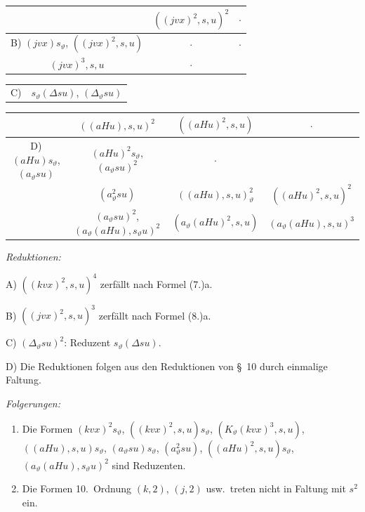 \documentclass[12pt,a4paper]{article}
\begin{document}
\begin{center}
\begin{tabular}{c|c|c}
& $((jvx)^2, s, u)^2$ & $\cdot$ \\
\hline
B) $(jvx)s_\vartheta$, $((jvx)^2, s, u)$ & $\cdot$ & $\cdot$ \\
$(jvx)^3, s, u$ & $\cdot$ &
\end{tabular}
\end{center}

\begin{center}
\begin{tabular}{c|c}
C) & $s_\vartheta(\varDelta su)$, $(\varDelta_\vartheta su)$
\end{tabular}
\end{center}

\begin{center}
\begin{tabular}{c|c|c|c}
& $((aHu), s, u)^2$ & $((aHu)^2, s, u)$ & $\cdot$ \\
\hline
D) $(aHu)s_\vartheta$, $(a_\vartheta su)$ & $(aHu)^2 s_\vartheta$, $(a_\vartheta su)^2$ & $\cdot$ \\
& $(a_\vartheta^2 su)$ & $((aHu), s, u)_\vartheta^2$ & $((aHu)^2, s, u)^2$ \\
& $(a_\vartheta su)^2$, $(a_\vartheta(aHu), s_\vartheta u)^2$ & $(a_\vartheta(aHu)^2, s, u)$ & $(a_\vartheta(aHu), s, u)^3$
\end{tabular}
\end{center}

\textit{Reduktionen:}

A) $((kvx)^2, s, u)^4$ zerfällt nach Formel (7.)a.

B) $((jvx)^2, s, u)^3$ zerfällt nach Formel (8.)a.

C) $(\varDelta_\vartheta su)^2$: Reduzent $s_\vartheta (\varDelta su)$.

D) Die Reduktionen folgen aus den Reduktionen von \S\ 10 durch einmalige Faltung.

\textit{Folgerungen:}
\begin{enumerate}
\item[1)] Die Formen $(kvx)^2 s_\vartheta$, $((kvx)^2, s, u)s_\vartheta$, $(K_\vartheta(kvx)^3, s, u)$, $((aHu), s, u)s_\vartheta$, $(a_\vartheta su)s_\vartheta$, $(a_\vartheta^2 su)$, $((aHu)^2, s, u)s_\vartheta$, $(a_\vartheta(aHu), s_\vartheta u)^2$ sind Reduzenten.
\item[2)] Die Formen 10.\ Ordnung $(k,2)$, $(j,2)$ usw.\ treten nicht in Faltung mit $s^2$ ein.
\end{enumerate}
\end{document}
